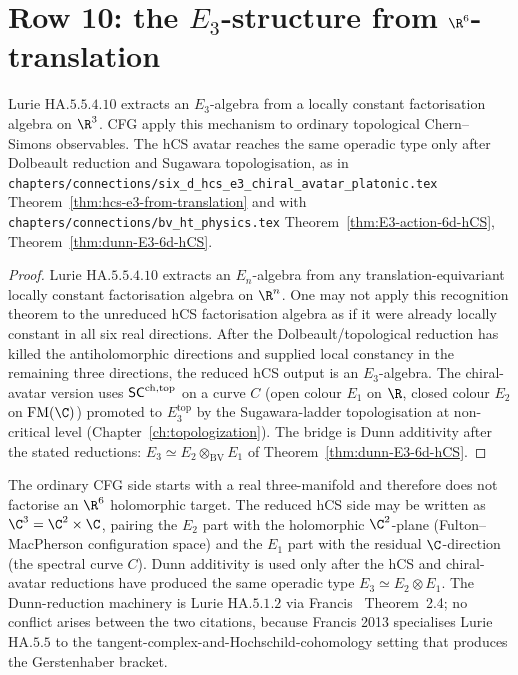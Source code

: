 \section{\texorpdfstring{Row 10: the $E_3$-structure from $\R^6$-translation}{Row 10: the E3 structure from R6 translation}}
\label{sec:cfg-row-10-e3-translation}

\begin{theorem}
\label{thm:cfg-row-10}
Lurie $\mathrm{HA}.5.5.4.10$ extracts an $E_3$-algebra from a locally
constant factorisation algebra on $\R^3$. CFG apply this mechanism to
ordinary topological Chern--Simons observables. The hCS avatar reaches
the same operadic type only after Dolbeault reduction and Sugawara
topologisation, as in
\texttt{chapters/connections/six\_d\_hcs\_e3\_chiral\_avatar\_platonic.tex}
Theorem~\ref{thm:hcs-e3-from-translation} and with
\texttt{chapters/connections/bv\_ht\_physics.tex}
Theorem~\ref{thm:E3-action-6d-hCS}, Theorem~\ref{thm:dunn-E3-6d-hCS}.
\end{theorem}

\begin{proof}
Lurie $\mathrm{HA}.5.5.4.10$ extracts an $E_n$-algebra from any
translation-equivariant locally constant factorisation algebra on
$\R^n$. One may not apply this recognition theorem to the unreduced hCS
factorisation algebra as if it were already locally constant in all six
real directions. After the Dolbeault/topological reduction has killed
the antiholomorphic directions and supplied local constancy in the
remaining three directions, the reduced hCS output is an $E_3$-algebra.
The chiral-avatar version uses
$\mathsf{SC}^{\mathrm{ch},\mathrm{top}}$ on a curve $C$ (open colour $E_1$ on $\R$, closed colour
$E_2$ on $\mathrm{FM}(\C)$) promoted to $E_3^{\mathrm{top}}$ by the
Sugawara-ladder topologisation at non-critical level
(Chapter~\ref{ch:topologization}). The bridge is Dunn additivity after
the stated reductions:
$E_3\simeq E_2\otimes_{\mathrm{BV}} E_1$ of
Theorem~\ref{thm:dunn-E3-6d-hCS}.
\end{proof}

\begin{remark}
\label{rem:cfg-row-10-dunn}
The ordinary CFG side starts with a real three-manifold and therefore
does not factorise an $\R^6$ holomorphic target. The reduced hCS side
may be written as $\C^3=\C^2\times\C$, pairing the $E_2$ part with the
holomorphic $\C^2$-plane (Fulton--MacPherson configuration space) and
the $E_1$ part with the residual $\C$-direction (the spectral curve
$C$). Dunn additivity is used only after the hCS and chiral-avatar
reductions have produced the same operadic type
$E_3\simeq E_2\otimes E_1$. The
Dunn-reduction machinery is Lurie $\mathrm{HA}.5.1.2$ via
Francis~\cite{francis2013tangent} Theorem~2.4; no conflict arises
between the two citations, because Francis 2013 specialises Lurie
$\mathrm{HA}.5.5$ to the tangent-complex-and-Hochschild-cohomology
setting that produces the Gerstenhaber bracket.
\end{remark}


